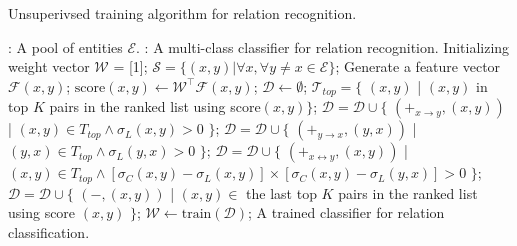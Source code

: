 \begin{algorithm*}[!htb]
  
  \caption{Unsuperivsed training algorithm for relation recognition.}
  \begin{algorithmic}[1]
    : A pool of entities $\mathcal{E}$.
    : A multi-class classifier for relation recognition.
    \STATE
    \STATE Initializing weight vector $\mathcal{W}$ = [1];
    \STATE $\mathcal{S} = \{ (x,y) | \forall x, \forall y \neq x \in \mathcal{E} \}$;
    \STATE Generate a feature vector $\mathcal{F}(x,y)$;
    \ENDFOR
    \STATE $\text{score}(x,y) \leftarrow \mathcal{W}^\top \mathcal{F}(x,y)$;
    \ENDFOR
    \STATE $\mathcal{D} \leftarrow \emptyset$;
    \STATE $\mathcal{T}_{top} = \{$ $(x,y)$ | $(x,y)$ in top $K$ pairs in the ranked list using score$(x,y) \}$;
    \STATE $\mathcal{D} = \mathcal{D} \cup \{$ $(+_{x \rightarrow y}, (x,y))$ | $(x,y) \in T_{top} \wedge \sigma_L(x,y) > 0$ $\}$;
    \STATE $\mathcal{D} = \mathcal{D} \cup \{$ $(+_{y \rightarrow x}, (y,x))$ | $(y,x) \in T_{top} \wedge \sigma_L(y,x) > 0$ $\}$;
    \STATE $\mathcal{D} = \mathcal{D} \cup \{$ $(+_{x \leftrightarrow y}, (x,y))$ | $(x,y) \in T_{top} \wedge [\sigma_C(x,y)-\sigma_L(x,y)] \times [\sigma_C(x,y)-\sigma_L(y,x)] > 0$ $\}$;
    \STATE $\mathcal{D} = \mathcal{D} \cup \{$ $(-, (x,y))$ | $(x,y) \in$ the last top $K$ pairs in the ranked list using score $(x,y)$ $\}$;
    \ENDFOR
    \STATE $\mathcal{W} \leftarrow \text{train}(\mathcal{D})$;
    \ENDWHILE
    \RETURN A trained classifier for relation classification.
  \end{algorithmic}
  \label{alg:unsup}
\end{algorithm*}

